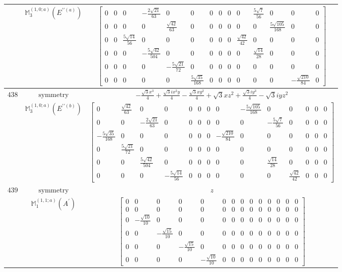 \documentclass[fleqn,8pt,landscape]{jsarticle}
\begin{document}
\begin{longtable}{ccc}
$  $ & $ \mathbb{M}_{3}^{(1,0;a)}(E^{\prime\prime(a)}) $ & $ \begin{bmatrix} 0 & 0 & 0 & - \frac{2 \sqrt{21}}{63} & 0 & 0 & 0 & 0 & 0 & 0 & \frac{5 \sqrt{7}}{56} & 0 & 0 & 0 \\ 0 & 0 & 0 & 0 & \frac{\sqrt{42}}{63} & 0 & 0 & 0 & 0 & 0 & 0 & \frac{5 \sqrt{105}}{168} & 0 & 0 \\ 0 & 0 & \frac{5 \sqrt{14}}{56} & 0 & 0 & 0 & 0 & 0 & 0 & \frac{\sqrt{42}}{42} & 0 & 0 & 0 & 0 \\ 0 & 0 & 0 & - \frac{5 \sqrt{42}}{504} & 0 & 0 & 0 & 0 & 0 & 0 & \frac{\sqrt{14}}{28} & 0 & 0 & 0 \\ 0 & 0 & 0 & 0 & - \frac{5 \sqrt{21}}{72} & 0 & 0 & 0 & 0 & 0 & 0 & 0 & 0 & 0 \\ 0 & 0 & 0 & 0 & 0 & \frac{5 \sqrt{35}}{168} & 0 & 0 & 0 & 0 & 0 & 0 & - \frac{\sqrt{210}}{84} & 0 \end{bmatrix} $ \\ \hline
$ 438 $ & $ \text{symmetry} $ & $ - \frac{\sqrt{3} x^{3}}{4} + \frac{\sqrt{3} i x^{2} y}{4} - \frac{\sqrt{3} x y^{2}}{4} + \sqrt{3} x z^{2} + \frac{\sqrt{3} i y^{3}}{4} - \sqrt{3} i y z^{2} $ \\
$  $ & $ \mathbb{M}_{3}^{(1,0;a)}(E^{\prime\prime(b)}) $ & $ \begin{bmatrix} 0 & \frac{\sqrt{42}}{63} & 0 & 0 & 0 & 0 & 0 & 0 & - \frac{5 \sqrt{105}}{168} & 0 & 0 & 0 & 0 & 0 \\ 0 & 0 & - \frac{2 \sqrt{21}}{63} & 0 & 0 & 0 & 0 & 0 & 0 & - \frac{5 \sqrt{7}}{56} & 0 & 0 & 0 & 0 \\ - \frac{5 \sqrt{35}}{168} & 0 & 0 & 0 & 0 & 0 & 0 & - \frac{\sqrt{210}}{84} & 0 & 0 & 0 & 0 & 0 & 0 \\ 0 & \frac{5 \sqrt{21}}{72} & 0 & 0 & 0 & 0 & 0 & 0 & 0 & 0 & 0 & 0 & 0 & 0 \\ 0 & 0 & \frac{5 \sqrt{42}}{504} & 0 & 0 & 0 & 0 & 0 & 0 & \frac{\sqrt{14}}{28} & 0 & 0 & 0 & 0 \\ 0 & 0 & 0 & - \frac{5 \sqrt{14}}{56} & 0 & 0 & 0 & 0 & 0 & 0 & \frac{\sqrt{42}}{42} & 0 & 0 & 0 \end{bmatrix} $ \\ \hline
$ 439 $ & $ \text{symmetry} $ & $ z $ \\
$  $ & $ \mathbb{M}_{1}^{(1,1;a)}(A^{\prime}) $ & $ \begin{bmatrix} 0 & 0 & 0 & 0 & 0 & 0 & 0 & 0 & 0 & 0 & 0 & 0 & 0 & 0 \\ 0 & 0 & 0 & 0 & 0 & 0 & 0 & 0 & 0 & 0 & 0 & 0 & 0 & 0 \\ 0 & - \frac{\sqrt{10}}{10} & 0 & 0 & 0 & 0 & 0 & 0 & 0 & 0 & 0 & 0 & 0 & 0 \\ 0 & 0 & - \frac{\sqrt{15}}{10} & 0 & 0 & 0 & 0 & 0 & 0 & 0 & 0 & 0 & 0 & 0 \\ 0 & 0 & 0 & - \frac{\sqrt{15}}{10} & 0 & 0 & 0 & 0 & 0 & 0 & 0 & 0 & 0 & 0 \\ 0 & 0 & 0 & 0 & - \frac{\sqrt{10}}{10} & 0 & 0 & 0 & 0 & 0 & 0 & 0 & 0 & 0 \end{bmatrix} $ \\ \hline

\end{longtable}
\end{document}
